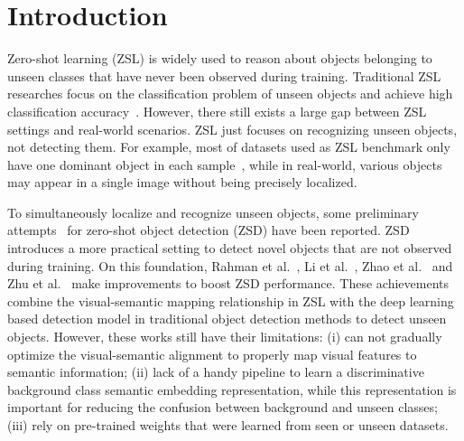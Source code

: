 \documentclass[runningheads]{llncs}
\begin{document}
\section{Introduction}

Zero-shot learning (ZSL) is widely used to reason about objects belonging to unseen classes that have never been observed during training. Traditional ZSL researches focus on the classification problem of unseen objects and achieve high classification accuracy~\cite{zhang2016zero1}. However, there still exists a large gap between ZSL settings and real-world scenarios. ZSL just focuses on recognizing unseen objects, not detecting them. For example, most of datasets used as ZSL benchmark only have one dominant object in each sample~\cite{nilsback2008automated,russakovsky2015imagenet,welinder2010caltech}, while in real-world, various objects may appear in a single image without being precisely localized.

To simultaneously localize and recognize unseen objects, some preliminary attempts~\cite{bansal2018zero,demirel2018zero,rahman2018zero,zhu2019zero} for zero-shot object detection (ZSD) have been reported. ZSD introduces a more practical setting to detect novel objects that are not observed during training. On this foundation, Rahman et al.~\cite{rahman2020improved}, Li et al.~\cite{li2019zero}, Zhao et al.~\cite{zhao2020gtnet} and Zhu et al.~\cite{zhu2020don} make improvements to boost ZSD performance.
These achievements combine the visual-semantic mapping relationship in ZSL with the deep learning based detection model in traditional object detection methods to detect unseen objects. However, these works still have their limitations: (i) can not gradually optimize the visual-semantic alignment to properly map visual features to semantic information; (ii) lack of a handy pipeline to learn a discriminative background class semantic embedding representation, while this representation is important for reducing the confusion between background and unseen classes; (iii) rely on pre-trained weights that were learned from seen or unseen datasets.
\end{document}
